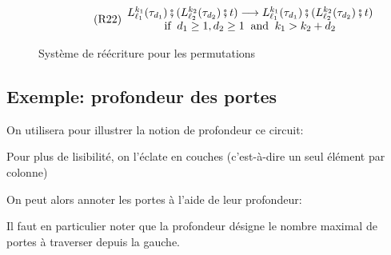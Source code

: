 \documentclass[12pt, a4paper]{article}
\newcommand{\layer}[3]{L^{\smash{#1}}_{\smash{#2}}(#3)}
\begin{document}
\begin{figure}[h]
{\begin{minipage}{0.982\linewidth}
\begin{center}
        \vspace{-0.5em}
        \hspace{-0.8em}
        \begin{subfigure}{0.74\textwidth}
            \begin{equation}\label{ru:swap:layercomctx}\tag{R22}
                \begin{array}{c}
                    \layer{k_1}{\ell_1}{\tau_{d_1}}\fatsemi (\layer{k_2}{\ell_2}{\tau_{d_2}}\fatsemi t) \longrightarrow \layer{k_1}{\ell_1}{\tau_{d_1}}\fatsemi (\layer{k_2}{\ell_2}{\tau_{d_2}}\fatsemi t) \\
                    \text{if}\;\; d_1\ge1,d_2\ge1 \;\;\text{and}\;\; k_1>k_2+d_2
                \end{array}
            \end{equation}
        \end{subfigure}
        \vspace{0.2em}
    \end{center}\end{minipage}}
    \caption{
        \label{fig:perm_rws}
        Système de réécriture pour les permutations
    }
\end{figure}

\newpage

\subsection{Exemple: profondeur des portes}
\label{ann:depth}

On utilisera pour illustrer la notion de profondeur ce circuit:

\begin{center}
    
\end{center}

Pour plus de lisibilité, on l'éclate en couches (c'est-à-dire un seul élément par colonne)

\begin{center}
    
\end{center}

On peut alors annoter les portes à l'aide de leur profondeur:

\begin{center}
    
\end{center}

Il faut en particulier noter que la profondeur désigne le nombre maximal de portes à traverser depuis la gauche.
\end{document}
